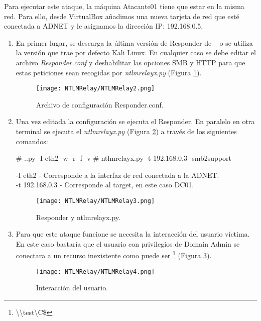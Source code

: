 Para ejecutar este ataque, la máquina Atacante01 tiene que estar en la misma red. Para ello, desde VirtualBox añadimos una nueva tarjeta de red que esté conectada a ADNET y le asignamos la dirección IP: 192.168.0.5.

\begin{enumerate}

\item En primer lugar, se descarga la última versión de Responder de ~\cite{Capitulo5:Responder} o se utiliza la versión que trae por defecto Kali Linux. En cualquier caso se debe editar el archivo {\it Responder.conf} y deshabilitar las opciones SMB y HTTP para que estas peticiones sean recogidas por {\it ntlmrelayx.py} (Figura \ref{NTLMRelay2}).
\begin{figure}[H] %
\begin{center}
\texttt{[image: NTLMRelay/NTLMRelay2.png]}
\end{center}
\caption{Archivo de configuración Responder.conf.}
\label{NTLMRelay2}
\end{figure}

\item Una vez editada la configuración se ejecuta el Responder. En paralelo en otra terminal se ejecuta el {\it ntlmrelayx.py} (Figura \ref{NTLMRelay3}) a través de los siguientes comandos:

\begin{listing}[style=consola, numbers=none]
# .\Responder.py -I eth2 -w -r -f -v
# ntlmrelayx.py -t 192.168.0.3 -smb2support
\end{listing}

-I eth2 - Corresponde a la interfaz de red conectada a la ADNET. \\
-t 192.168.0.3 - Corresponde al target, en este caso DC01. 

\begin{figure}[H] %
\begin{center}
\texttt{[image: NTLMRelay/NTLMRelay3.png]}
\end{center}
\caption{Responder y ntlmrelayx.py.}
\label{NTLMRelay3}
\end{figure}

\item Para que este ataque funcione se necesita la interacción del usuario víctima. En este caso bastaría que el usuario con privilegios de Domain Admin se conectara a un recurso inexistente como puede ser \footnote{\textbackslash{}\textbackslash{}test\textbackslash{}C\$} (Figura \ref{NTLMRelay4}).
\begin{figure}[H] %
\begin{center}
\texttt{[image: NTLMRelay/NTLMRelay4.png]}
\end{center}
\caption{Interacción del usuario.}
\label{NTLMRelay4}
\end{figure}


\end{enumerate}
